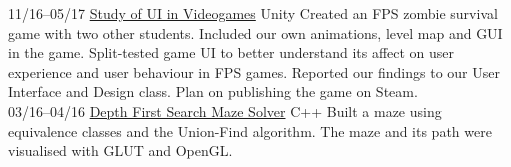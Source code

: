 \documentclass[]{friggeri-cv}
\begin{document}
\begin{entrylist}
 
 \entry
    {11/16–05/17}
    {\href{https://connect.unity.com/u/5839ddf732b306002a9e7422}{Study of UI in Videogames}}
    {Unity}
    {{Created an FPS zombie survival game with two other students. Included our own animations, level map and GUI in the game. Split-tested game UI to better understand its affect on user experience and user behaviour in FPS games. Reported our findings to our User Interface and Design class. Plan on publishing the game on Steam.\\}%
    }
 \entry
    {03/16–04/16}
    {\href{https://github.com/nguyen-khoa/CS200Lab4}{Depth First Search Maze Solver}}
    {C++}
    {Built a maze using equivalence classes and the Union-Find algorithm. The maze and its path were visualised with GLUT and OpenGL. \\}
 \end{entrylist}
 
 
\end{document}
